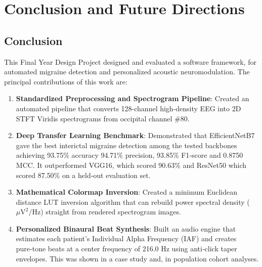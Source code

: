 \documentclass[12pt, a4paper]{report}
\begin{document}
\chapter{Conclusion and Future Directions}
\label{ch:conclusion}

\section{Conclusion}
\label{sec:conclusion}
This Final Year Design Project designed and evaluated a software framework, for automated migraine detection and personalized acoustic neuromodulation. The principal contributions of this work are:

\begin{enumerate}
    \item \textbf{Standardized Preprocessing and Spectrogram Pipeline}: Created an automated pipeline that converts 128-channel high-density EEG into 2D STFT Viridis spectrograms from occipital channel \#80.
    \item \textbf{Deep Transfer Learning Benchmark}: Demonstrated that EfficientNetB7 gave the best interictal migraine detection among the tested backbones achieving 93.75\% accuracy 94.71\% precision, 93.85\% F1‑score and 0.8750 MCC. It outperformed VGG16, which scored 90.63\% and ResNet50 which scored 87.50\% on a held‑out evaluation set.
    \item \textbf{Mathematical Colormap Inversion}: Created a minimum Euclidean distance LUT inversion algorithm that can rebuild power spectral density ($\mu\text{V}^2/\text{Hz}$) straight from rendered spectrogram images.
    \item \textbf{Personalized Binaural Beat Synthesis}: Built an audio engine that estimates each patient’s Individual Alpha Frequency (IAF) and creates pure‑tone beats at a center frequency of 216.0 Hz using anti‑click taper envelopes. This was shown in a case study and, in population cohort analyses.
\end{enumerate}
\end{document}
